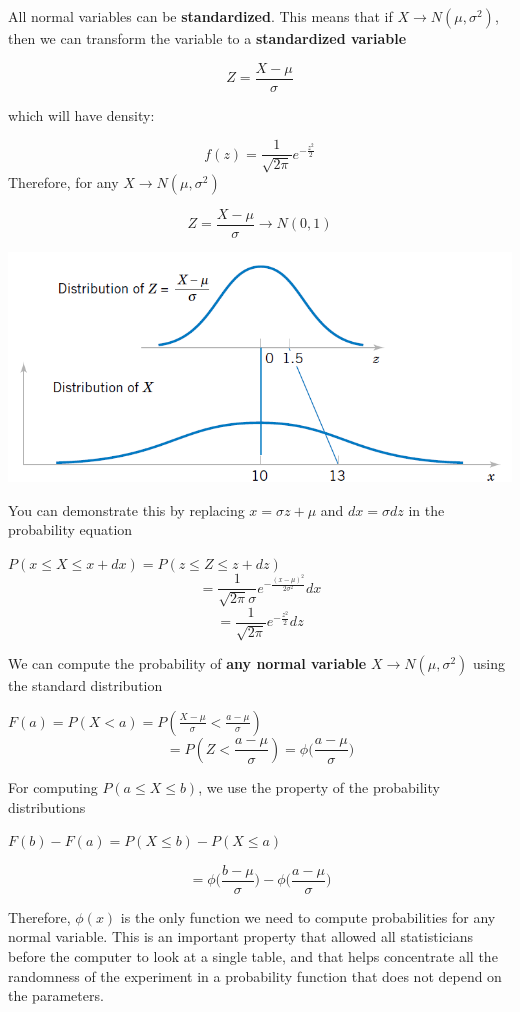 \documentclass[
]{book}
\begin{document}
All normal variables can be \textbf{standardized}. This means that if \(X \rightarrow N(\mu, \sigma^2)\), then we can transform the variable to
a \textbf{standardized variable}

\[Z=\frac{X-\mu}{\sigma}\]

which will have density:

\[f(z)=\frac{1}{ \sqrt{2\pi}}e^{-\frac{z^2}{2}}\]
Therefore, for any \(X \rightarrow N(\mu, \sigma^2)\)

\[Z=\frac{X-\mu}{\sigma} \rightarrow N(0, 1) \]

\includegraphics{./figures/stand.png}

You can demonstrate this by replacing \(x=\sigma z+\mu\) and \(dx=\sigma dz\) in the probability equation

\(P(x\leq X \leq x +dx)=P(z\leq Z \leq z +dz)\)
\[=\frac{1}{\sqrt{2\pi}\sigma}e^{-\frac{(x-\mu)^2}{2\sigma^2}}dx\] \[=\frac{1}{ \sqrt{2\pi}}e^{-\frac{z^2}{2}} dz\]

We can compute the probability of \textbf{any normal variable} \(X\rightarrow N(\mu, \sigma^2)\) using the standard distribution

\(F(a)=P(X<a)=P(\frac{X-\mu}{\sigma}<\frac{a-\mu}{\sigma})\)
\[=P(Z < \frac{a-\mu}{\sigma})= \phi \big(\frac{a-\mu}{\sigma}\big)\]

For computing \(P(a\leq X \leq b)\), we use the property of the probability distributions

\(F(b)-F(a)=P(X\leq b)-P(X\leq a)\)

\[=\phi \big(\frac{b-\mu}{\sigma}\big)-\phi \big(\frac{a-\mu}{\sigma}\big)\]

Therefore, \(\phi(x)\) is the only function we need to compute probabilities for any normal variable. This is an important property that allowed all statisticians before the computer to look at a single table, and that helps concentrate all the randomness of the experiment in a probability function that does not depend on the parameters.
\end{document}
